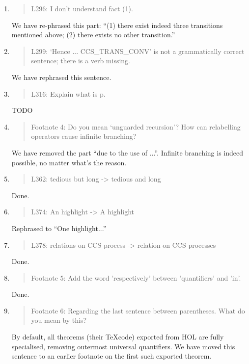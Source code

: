 \begin{enumerate}
\item \begin{quote}
    L296: I don’t understand fact (1).
  \end{quote}
We have re-phrased this part: ``(1) there exist indeed three
  transitions mentioned above; (2) there exists no other
  transition.''
  
\item \begin{quote}
    L299: ‘Hence ... CCS_TRANS_CONV’ is not a grammatically correct sentence; there is a verb missing.
  \end{quote}
  We have rephrased this sentence.

\item \begin{quote}
    L316: Explain what is p.
  \end{quote}
  TODO
  
\item \begin{quote}
    Footnote 4: Do you mean ‘unguarded recursion’? How can relabelling operators cause infinite branching?
  \end{quote}
  We have removed the part ``due to the use of ...''. Infinite
  branching is indeed possible, no matter what's the reason.
  
\item \begin{quote}
    L362: tedious but long -> tedious and long
  \end{quote}
  Done.
  
\item \begin{quote}
    L374: An highlight -> A highlight
  \end{quote}
  Rephrased to ``One highlight...''
  
\item \begin{quote}
    L378: relations on CCS process -> relation on CCS processes
  \end{quote}
  Done.
  
\item \begin{quote}
    Footnote 5: Add the word 'respectively' between 'quantifiers' and 'in'.
  \end{quote}
  Done.
  
\item \begin{quote}
    Footnote 6: Regarding the last sentence between parentheses. What do you mean by this?
  \end{quote}
  By default, all theorems (their \TeX code) exported from HOL are
  fully specialised, removing outermost universal quantifiers. We have
  moved this sentence to an earlier footnote on the first such exported theorem.
  

\end{enumerate}
